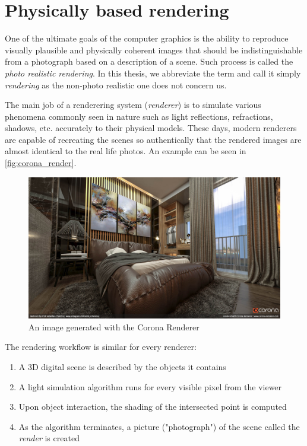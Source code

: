 \section{Physically based rendering}

One of the ultimate goals of the computer graphics is the ability to reproduce visually plausible and physically coherent images that should be indistinguishable from a photograph based on a description of a scene. Such process is called the \emph{photo realistic rendering}. In this thesis, we abbreviate the term and call it simply \emph{rendering} as the non-photo realistic one does not concern us.

The main job of a renderering system (\emph{renderer}) is to simulate various phenomena commonly seen in nature such as light reflections, refractions, shadows, etc. accurately to their physical models. These days, modern renderers are capable of recreating the scenes so authentically that the rendered images are almost identical to the real life photos. An example can be seen in \autoref{fig:corona_render}.

\begin{figure}[h]
	\centering
	\includegraphics[width=\linewidth]{img/corona_render.jpg}
	\caption[Corona image]{An image generated with the Corona Renderer\footnotemark}
	\label{fig:corona_render}
\end{figure}

The rendering workflow is similar for every renderer:
\begin{enumerate}
	\item A 3D digital scene is described by the objects it contains
	\item A light simulation algorithm runs for every visible pixel from the viewer
	\item Upon object interaction, the shading of the intersected point is computed
	\item As the algorithm terminates, a picture ("photograph") of the scene called the \emph{render} is created
\end{enumerate}

